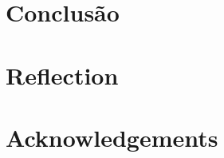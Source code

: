 \documentclass[11pt]{article}
\begin{document}





\section{Conclusão}


\section{Reflection}



\section{Acknowledgements}
\end{document}
